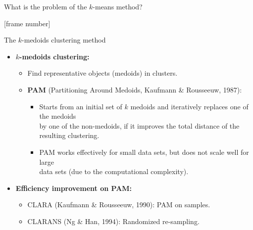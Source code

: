 \documentclass[aspectratio=169,t,xcolor=dvipsnames]{beamer}
\begin{document}
{\begin{frame}{What is the problem of the $k$-means method?}
    \end{frame}
  }

  {
    [frame number]
    \begin{frame}{The $k$-medoids clustering method}
      \begin{itemize}
        \item \textbf{$k$-medoids clustering:}
        \begin{itemize}
          \item Find representative objects (medoids) in clusters.
          \item \textbf{PAM} (Partitioning Around Medoids, Kaufmann \& Rousseeuw, 1987):
            \begin{itemize}
              \item Starts from an initial set of $k$ medoids and iteratively replaces one of the medoids \\
              by one of the non-medoids, if it improves the total distance of the resulting clustering.
              \item PAM works effectively for small data sets, but does not scale well for large\\
              data sets (due to the computational complexity).
            \end{itemize}
            \end{itemize}
        \item \textbf{Efficiency improvement on PAM:}
        \begin{itemize}
          \item CLARA (Kaufmann \& Rousseeuw, 1990): PAM on samples.
          \item CLARANS (Ng \& Han, 1994): Randomized re-sampling.
        \end{itemize}
      \end{itemize}
    \end{frame}
  }
\end{document}
